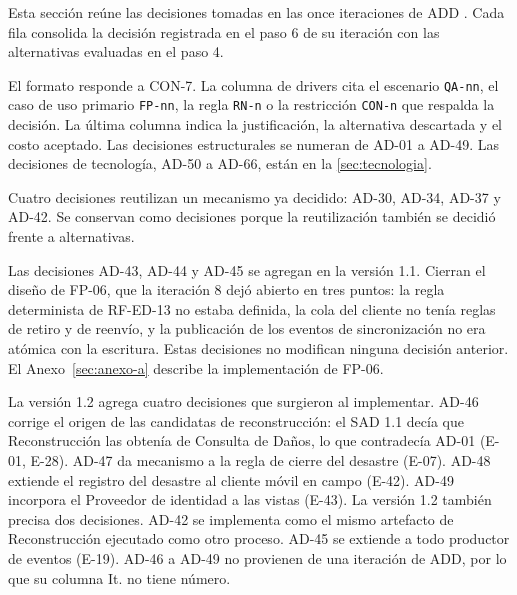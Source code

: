 \documentclass[11pt,letterpaper]{article}
\begin{document}
Esta sección reúne las decisiones tomadas en las once iteraciones de ADD \cite{iteraciones}. Cada
fila consolida la decisión registrada en el paso 6 de su iteración con las alternativas evaluadas en
el paso 4.

El formato responde a CON-7. La columna de drivers cita el escenario \texttt{QA-nn}, el caso de uso
primario \texttt{FP-nn}, la regla \texttt{RN-n} o la restricción \texttt{CON-n} que respalda la
decisión. La última columna indica la justificación, la alternativa descartada y el costo aceptado.
Las decisiones estructurales se numeran de AD-01 a AD-49. Las decisiones de tecnología, AD-50 a
AD-66, están en la \cref{sec:tecnologia}.

Cuatro decisiones reutilizan un mecanismo ya decidido: AD-30, AD-34, AD-37 y AD-42. Se conservan
como decisiones porque la reutilización también se decidió frente a alternativas.

Las decisiones AD-43, AD-44 y AD-45 se agregan en la versión 1.1. Cierran el diseño de FP-06, que la
iteración 8 dejó abierto en tres puntos: la regla determinista de RF-ED-13 no estaba definida, la
cola del cliente no tenía reglas de retiro y de reenvío, y la publicación de los eventos de
sincronización no era atómica con la escritura. Estas decisiones no modifican ninguna decisión
anterior. El Anexo~\ref{sec:anexo-a} describe la implementación de FP-06.

La versión 1.2 agrega cuatro decisiones que surgieron al implementar. AD-46 corrige el origen de
las candidatas de reconstrucción: el SAD 1.1 decía que Reconstrucción las obtenía de Consulta de
Daños, lo que contradecía AD-01 (E-01, E-28). AD-47 da mecanismo a la regla de cierre del desastre
(E-07). AD-48 extiende el registro del desastre al cliente móvil en campo (E-42). AD-49 incorpora
el Proveedor de identidad a las vistas (E-43). La versión 1.2 también precisa dos decisiones. AD-42
se implementa como el mismo artefacto de Reconstrucción ejecutado como otro proceso. AD-45 se
extiende a todo productor de eventos (E-19). AD-46 a AD-49 no provienen de una iteración de ADD,
por lo que su columna It. no tiene número.
\end{document}
